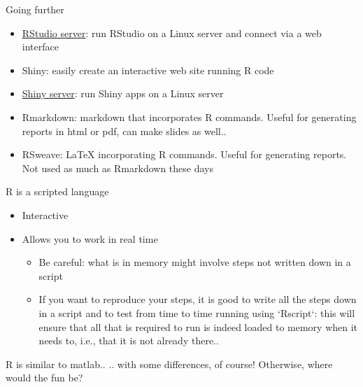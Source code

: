 \documentclass[aspectratio=169]{beamer}\usepackage[]{graphicx}\usepackage[]{xcolor}
\begin{document}
\begin{frame}{Going further}
\begin{itemize}
\item \href{https://posit.co/products/open-source/rstudio-server/}{RStudio server}: run RStudio on a Linux server and connect via a web interface \vfill
\item Shiny: easily create an interactive web site running R code \vfill
\item \href{https://www.rstudio.com/products/shiny/shiny-server/}{Shiny server}: run Shiny apps on a Linux server \vfill
\item Rmarkdown: markdown that incorporates R commands. Useful for generating reports in html or pdf, can make slides as well.. \vfill
\item RSweave: LaTeX incorporating R commands. Useful for generating reports. Not used as much as Rmarkdown these days
\end{itemize}
\end{frame} 

\begin{frame}{R is a scripted language}
\begin{itemize}
    \item Interactive
    \vfill
    \item Allows you to work in real time
    \begin{itemize}
        \item Be careful: what is in memory might involve steps not written down in a script
        \item If you want to reproduce your steps, it is good to write all the steps down in a script and to test from time to time running using `Rscript`: this will ensure that all that is required to run is indeed loaded to memory when it needs to, i.e., that it is not already there..
    \end{itemize}
\end{itemize}
\end{frame} 



\begin{frame}{R is similar to matlab..}
.. with some differences, of course! Otherwise, where would the fun be? \code{;)}
\end{frame} 
\end{document}
